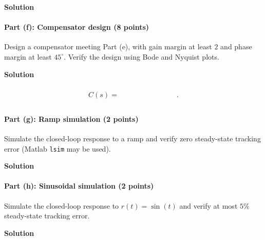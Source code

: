 \documentclass[11pt]{article}
\begin{document}
\textbf{Solution}\par

\paragraph{Part (f): Compensator design (8 points)}
Design a compensator meeting Part (e), with gain margin at least $2$ and phase margin at least $45^\circ$. Verify the design using Bode and Nyquist plots.

\textbf{Solution}\par
\[
C(s)=\boxed{\phantom{\dfrac{(s+1)(s+2)}{s(s+3)}}}.
\]

\paragraph{Part (g): Ramp simulation (2 points)}
Simulate the closed-loop response to a ramp and verify zero steady-state tracking error (Matlab \texttt{lsim} may be used).

\textbf{Solution}\par

\paragraph{Part (h): Sinusoidal simulation (2 points)}
Simulate the closed-loop response to $r(t)=\sin(t)$ and verify at most $5\%$ steady-state tracking error.

\textbf{Solution}\par
\end{document}
